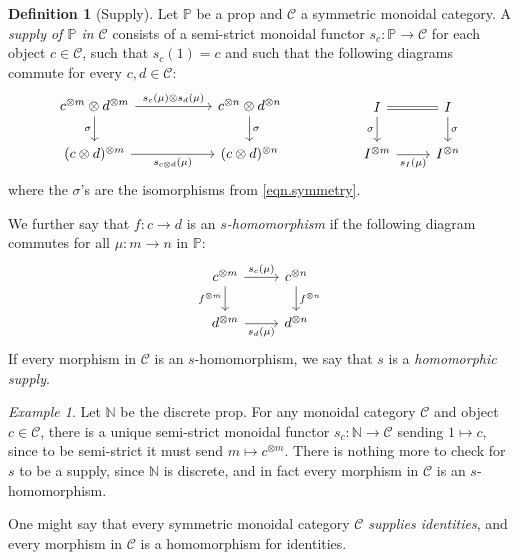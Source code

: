 \documentclass[11pt, oneside, article]{memoir}
\theoremstyle{plain}
\theoremstyle{definition}
\newtheorem{definition}[theorem]{Definition}
\theoremstyle{remark}
\newtheorem{example}[theorem]{Example}
\newcommand{\cat}[1]{\mathcal{#1}}%
\newcommand{\tpow}[1]{^{\otimes #1}}
\newcommand{\nn}{\mathbb{N}}
\newcommand{\pp}{\mathbb{P}}
\begin{document}
\begin{definition}[Supply]\label{def.supply}
Let $\pp$ be a prop and $\cat{C}$ a symmetric monoidal category. A \emph{supply of $\pp$ in $\cat{C}$} consists of a semi-strict monoidal functor $s_c\colon\pp\to\cat{C}$ for each object $c\in\cat{C}$, such that $s_c(1)=c$ and such that the following diagrams commute for every $c,d\in\cat{C}$:
\begin{equation}\label{eqn.supply_commute_tensors}
\begin{tikzcd}[column sep=55pt]
	c\tpow{m}\otimes d\tpow{m}\ar[r, "s_c(\mu)\otimes s_d(\mu)"]\ar[d, "\sigma"']&
	c\tpow{n}\otimes d\tpow{n}\ar[d, "\sigma"]\\
	(c\otimes d)\tpow{m}\ar[r, "s_{c\otimes d}(\mu)"']&
	(c\otimes d)\tpow{n}
\end{tikzcd}
\hspace{.7in}
\begin{tikzcd}
	I\ar[r, equal]\ar[d, "\sigma"']&
	I\ar[d, "\sigma"]\\
	I\tpow{m}\ar[r, "s_I(\mu)"']&
	I\tpow{n}
\end{tikzcd}
\end{equation}
where the $\sigma$'s are the isomorphisms from \cref{eqn.symmetry}.

We further say that $f\colon c\to d$ is an \emph{$s$-homomorphism} if the following diagram commutes for all $\mu\colon m\to n$ in $\pp$:
\begin{equation}\label{eqn.nat_means_homo}
\begin{tikzcd}
	c\tpow{m}\ar[r, "s_c(\mu)"]\ar[d, "f\tpow{m}"']&
	c\tpow{n}\ar[d, "f\tpow{n}"]\\
	d\tpow{m}\ar[r, "s_d(\mu)"']&
	d\tpow{n}
\end{tikzcd}
\end{equation}
If every morphism in $\cat{C}$ is an $s$-homomorphism, we say that $s$ is a \emph{homomorphic supply}.
\end{definition}

\begin{example}\label{ex.supply_ids}
Let $\nn$ be the discrete prop. For any monoidal category $\cat{C}$ and object $c\in\cat{C}$, there is a unique semi-strict monoidal functor $s_c\colon\nn\to\cat{C}$ sending $1\mapsto c$, since to be semi-strict it must send $m\mapsto c\tpow{m}$. There is nothing more to check for $s$ to be a supply, since $\nn$ is discrete, and in fact every morphism in $\cat{C}$ is an $s$-homomorphism. 

One might say that every symmetric monoidal category $\cat{C}$ \emph{supplies identities}, and every morphism in $\cat{C}$ is a homomorphism for identities.
\end{example}
\end{document}
